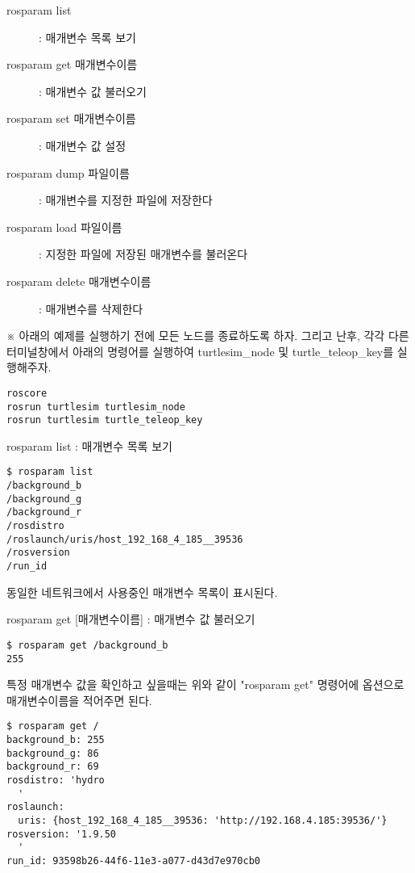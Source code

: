 \vspace{\baselineskip}
\noindent
\begin{description}
\item[rosparam list] : 매개변수 목록 보기
\item[rosparam get 매개변수이름] : 매개변수 값 불러오기
\item[rosparam set 매개변수이름] : 매개변수 값 설정 
\item[rosparam dump 파일이름] : 매개변수를 지정한 파일에 저장한다
\item[rosparam load 파일이름] : 지정한 파일에 저장된 매개변수를 불러온다
\item[rosparam delete 매개변수이름] : 매개변수를 삭제한다 
\end{description}

\vspace{\baselineskip}
\noindent
※ 아래의 예제를 실행하기 전에 모든 노드를 종료하도록 하자. 그리고 난후, 각각 다른 터미널창에서 아래의 명령어를 실행하여 turtlesim\_node 및 turtle\_teleop\_key를 실행해주자.

\begin{lstlisting}[language=ROS]
roscore
rosrun turtlesim turtlesim_node 
rosrun turtlesim turtle_teleop_key
\end{lstlisting}

\setcounter{num}{0}

\vspace{\baselineskip}
\noindent
{}\circled{\thenum} rosparam list : 매개변수 목록 보기

\begin{lstlisting}[language=ROS]
$ rosparam list
/background_b
/background_g
/background_r
/rosdistro
/roslaunch/uris/host_192_168_4_185__39536
/rosversion
/run_id
\end{lstlisting}

\noindent
동일한 네트워크에서 사용중인 매개변수 목록이 표시된다.

\vspace{\baselineskip}
\noindent
{}\circled{\thenum} rosparam get [매개변수이름] : 매개변수 값 불러오기

\begin{lstlisting}[language=ROS]
$ rosparam get /background_b
255
\end{lstlisting}

\noindent
특정 매개변수 값을 확인하고 싶을때는 위와 같이 "rosparam get" 명령어에 옵션으로 매개변수이름을 적어주면 된다.

\begin{lstlisting}[language=ROS]
$ rosparam get /
background_b: 255
background_g: 86
background_r: 69
rosdistro: 'hydro
  '
roslaunch:
  uris: {host_192_168_4_185__39536: 'http://192.168.4.185:39536/'}
rosversion: '1.9.50
  '
run_id: 93598b26-44f6-11e3-a077-d43d7e970cb0
\end{lstlisting}

